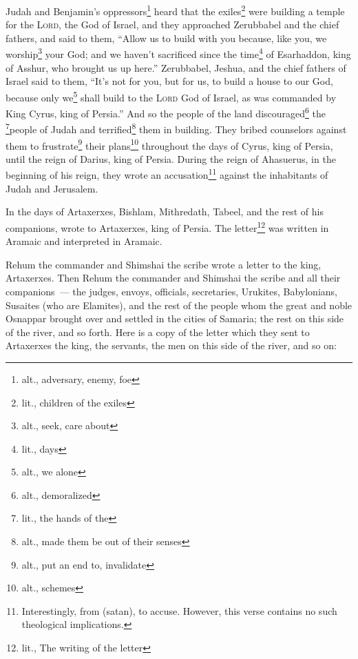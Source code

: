 
\begin{inparaenum}
     Judah and Benjamin's oppressors\footnote{alt., adversary, enemy, foe} heard that the exiles\footnote{lit., children of the exiles} were building a temple for the \textsc{Lord}, the God of Israel,%
     and they approached Zerubbabel and the chief fathers, and said to them, ``Allow us to build with you because, like you, we worship\footnote{alt., seek, care about} your God; and we haven't sacrificed since the time\footnote{lit., days} of Esarhaddon, king of Asshur, who brought us up here.''%
     Zerubbabel, Jeshua, and the chief fathers of Israel said to them, ``It's not for you, but for us, to build a house to our God, because only we\footnote{alt., we alone} shall build to the \textsc{Lord} God of Israel, as was commanded by King Cyrus, king of Persia.''%
     And so the people of the land discouraged\footnote{alt., demoralized} the \footnote{lit., the hands of the}people of Judah and terrified\footnote{alt., made them be out of their senses} them in building.%
     They bribed counselors against them to frustrate\footnote{alt., put an end to, invalidate} their plans\footnote{alt., schemes} throughout the days of Cyrus, king of Persia, until the reign of Darius, king of Persia.%
     During the reign of Ahasuerus, in the beginning of his reign, they wrote an accusation\footnote{Interestingly, from  (satan), to accuse. However, this verse contains no such theological implications.} against the inhabitants of Judah and Jerusalem.%
    
     In the days of Artaxerxes, Bishlam, Mithredath, Tabeel, and the rest of his companions, wrote to Artaxerxes, king of Persia. The letter\footnote{lit., The writing of the letter} was written in Aramaic and interpreted in Aramaic.%
    
     Rehum the commander and Shimshai the scribe wrote a letter to the king, Artaxerxes.%
     Then Rehum the commander and Shimshai the scribe and all their companions~--- the judges, envoys, officials, secretaries, Urukites, Babylonians, Susaites (who are Elamites),%
     and the rest of the people whom the great and noble Osnappar brought over and settled in the cities of Samaria; the rest on this side of the river, and so forth.%
     Here is a copy of the letter which they sent to Artaxerxes the king, the servants, the men on this side of the river, and so on:%
    

\end{inparaenum}

